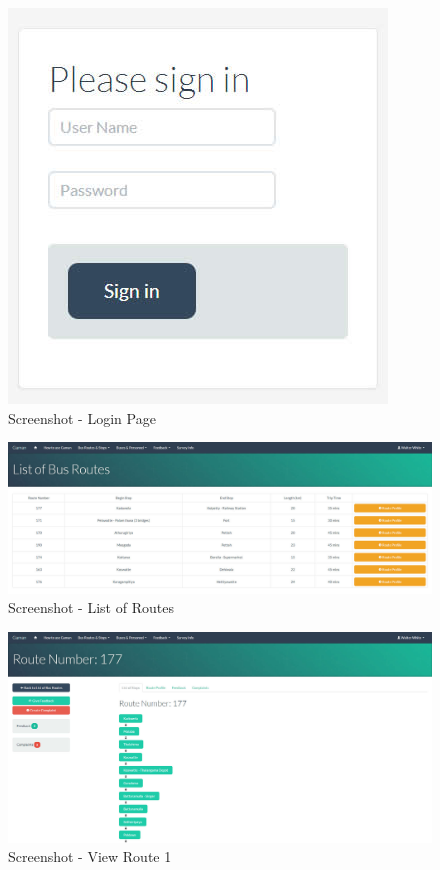 \begin {figure} [h!]
\centering
\includegraphics[scale=0.5]{loginPage}
\caption [Screenshot - Login Page] {Screenshot - Login Page}
\label {image-loginPage}
\end {figure}

\begin {figure} [h!]
\centering
\includegraphics[scale=0.2]{listRoutes}
\caption [Screenshot - List of Routes] {Screenshot - List of Routes}
\label {image-listRoutes}
\end {figure}


\begin {figure} [h!]
\centering
\includegraphics[scale=0.2]{viewRoute1}
\caption [Screenshot - View Route 1] {Screenshot - View Route 1}
\label {image-viewRoute1}
\end {figure}


